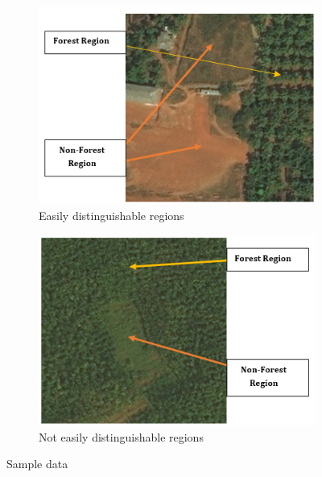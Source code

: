 \documentclass[rnd]{mas_proposal}
\begin{document}
\begin{figure}
        \centering
        \begin{subfigure}{.5\textwidth}
          \centering
          \includegraphics[width=1.0\linewidth]{images/fig1.PNG}
          \caption{Easily distinguishable regions}
          \label{fig:forest-easy}
        \end{subfigure}%
        \begin{subfigure}{.5\textwidth}
          \centering
          \includegraphics[width=1.03\linewidth]{images/fig2}
          \caption{Not easily distinguishable regions}
          \label{fig:forest-hard}
        \end{subfigure}
        \caption{Sample data}
        \label{fig:Sample data}
\end{figure}
\end{document}
